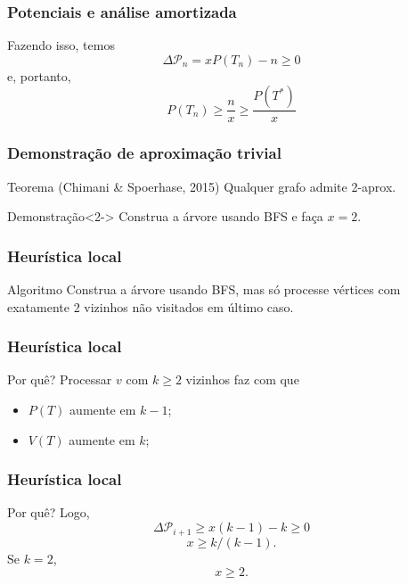 \documentclass[14pt]{beamer}
\begin{document}
\begin{frame}
\frametitle{Potenciais e an\'alise amortizada}
Fazendo isso, temos
\begin{equation}
\Delta \mathcal{P}_n = xP(T_n) - n \ge 0
\end{equation}
e, portanto,
\begin{equation}
P(T_n) \ge \frac{n}{x} \ge \frac{P(T^*)}{x}
\end{equation}
\end{frame}

\begin{frame}
\frametitle{Demonstra\c{c}\~ao de aproxima\c{c}\~ao trivial}
\begin{block}{Teorema (Chimani \& Spoerhase, 2015)}
Qualquer grafo admite 2-aprox.
\end{block}

\begin{block}{Demonstra\c{c}\~ao}<2->
Construa a \'arvore usando BFS e fa\c{c}a $x = 2$.
\end{block}
\end{frame}

\begin{frame}
\frametitle{Heur\'istica local}
\begin{block}{Algoritmo}
Construa a \'arvore usando BFS, mas s\'o processe v\'ertices com exatamente 2 vizinhos n\~ao visitados em \'ultimo caso.
\end{block}
\end{frame}

\begin{frame}
\frametitle{Heur\'istica local}
\begin{block}{Por qu\^e?}
Processar $v$ com $k \ge 2$ vizinhos faz com que
\begin{itemize}
\item $P(T)$ aumente em $k - 1$;
\item $V(T)$ aumente em $k$;
\end{itemize}
\end{block}
\end{frame}

\begin{frame}
\frametitle{Heur\'istica local}
\begin{block}{Por qu\^e?}
Logo,
\begin{equation}
\Delta \mathcal{P}_{i + 1} \ge x(k - 1) - k \ge 0
\end{equation}
\begin{equation}
x \ge k/(k - 1).
\end{equation}
\pause
Se $k = 2$,
\begin{equation}
x \ge 2.
\end{equation}
\end{block}
\end{frame}
\end{document}
